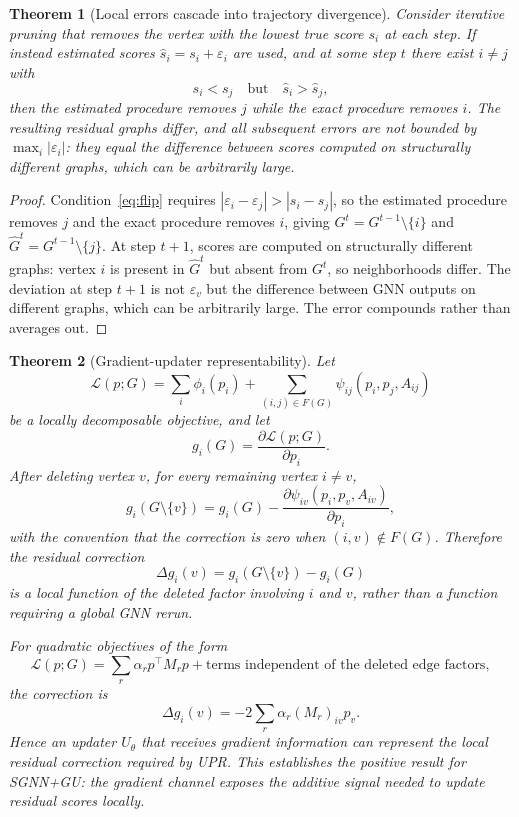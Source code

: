 \documentclass[11pt]{article}
\theoremstyle{plain}
\newtheorem{theorem}{Theorem}[section]
\theoremstyle{definition}
\theoremstyle{remark}
\begin{document}
\begin{theorem}[Local errors cascade into trajectory divergence]
  \label{thm:propagation}
  Consider iterative pruning that removes the vertex with the lowest true score $s_i$
  at each step. If instead estimated scores $\hat{s}_i = s_i + \varepsilon_i$ are
  used, and at some step $t$ there exist $i \neq j$ with
  \begin{equation}
    s_i < s_j \quad \text{but} \quad \hat{s}_i > \hat{s}_j,
    \label{eq:flip}
  \end{equation}
  then the estimated procedure removes $j$ while the exact procedure removes $i$.
  The resulting residual graphs differ, and all subsequent errors are not bounded by
  $\max_i |\varepsilon_i|$: they equal the difference between scores computed on
  structurally different graphs, which can be arbitrarily large.
\end{theorem}
\begin{proof}
  Condition~\eqref{eq:flip} requires $|\varepsilon_i - \varepsilon_j| > |s_i -
  s_j|$, so the estimated procedure removes $j$ and the exact procedure removes $i$,
  giving $G^t = G^{t-1} \setminus \{i\}$ and $\hat{G}^t = G^{t-1} \setminus \{j\}$.
  At step $t+1$, scores are computed on structurally different graphs: vertex $i$
  is present in $\hat{G}^t$ but absent from $G^t$, so neighborhoods differ. The
  deviation at step $t+1$ is not $\varepsilon_v$ but the difference between GNN
  outputs on different graphs, which can be arbitrarily large. The error compounds
  rather than averages out.
\end{proof}

\begin{theorem}[Gradient-updater representability]
  \label{thm:gu_positive}
  Let
  \[
    \mathcal{L}(p;G)
    =
    \sum_i \phi_i(p_i)
    +
    \sum_{(i,j)\in F(G)}
    \psi_{ij}(p_i,p_j,A_{ij})
  \]
  be a locally decomposable objective, and let
  \[
    g_i(G)=\frac{\partial \mathcal{L}(p;G)}{\partial p_i}.
  \]
  After deleting vertex \(v\), for every remaining vertex \(i\neq v\),
  \[
    g_i(G\setminus \{v\})
    =
    g_i(G)
    -
    \frac{\partial \psi_{iv}(p_i,p_v,A_{iv})}{\partial p_i},
  \]
  with the convention that the correction is zero when \((i,v)\notin F(G)\).
  Therefore the residual correction
  \[
    \Delta g_i(v)
    =
    g_i(G\setminus \{v\})-g_i(G)
  \]
  is a local function of the deleted factor involving \(i\) and \(v\), rather than a
  function requiring a global GNN rerun.

  For quadratic objectives of the form
  \[
    \mathcal{L}(p;G)
    =
    \sum_r \alpha_r p^\top M_r p
    +
    \text{terms independent of the deleted edge factors},
  \]
  the correction is
  \[
    \Delta g_i(v)
    =
    -2\sum_r \alpha_r (M_r)_{iv}p_v .
  \]
  Hence an updater \(U_\theta\) that receives gradient information can represent the
  local residual correction required by UPR. This establishes the positive result for
  SGNN+GU: the gradient channel exposes the additive signal needed to update residual
  scores locally.
\end{theorem}
\end{document}
